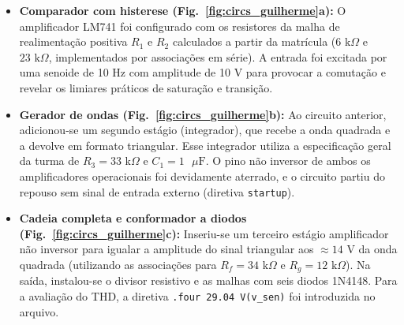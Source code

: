 \documentclass[11pt,a4paper]{article}
\begin{document}
\begin{itemize}
    \item \textbf{Comparador com histerese (Fig.~\ref{fig:circs_guilherme}a):} O amplificador LM741 foi configurado com os resistores da malha de realimentação positiva $R_1$ e $R_2$ calculados a partir da matrícula ($6\text{ k}\Omega$ e $23\text{ k}\Omega$, implementados por associações em série). A entrada foi excitada por uma senoide de 10 Hz com amplitude de 10 V para provocar a comutação e revelar os limiares práticos de saturação e transição. 
    
    \item \textbf{Gerador de ondas (Fig.~\ref{fig:circs_guilherme}b):} Ao circuito anterior, adicionou-se um segundo estágio (integrador), que recebe a onda quadrada e a devolve em formato triangular. Esse integrador utiliza a especificação geral da turma de $R_3 = 33\text{ k}\Omega$ e $C_1 = 1\text{ }\mu\text{F}$. O pino não inversor de ambos os amplificadores operacionais foi devidamente aterrado, e o circuito partiu do repouso sem sinal de entrada externo (diretiva \texttt{startup}).

    \item \textbf{Cadeia completa e conformador a diodos (Fig.~\ref{fig:circs_guilherme}c):} Inseriu-se um terceiro estágio amplificador não inversor para igualar a amplitude do sinal triangular aos $\approx 14\text{ V}$ da onda quadrada (utilizando as associações para $R_f = 34\text{ k}\Omega$ e $R_g = 12\text{ k}\Omega$). Na saída, instalou-se o divisor resistivo e as malhas com seis diodos 1N4148. Para a avaliação do THD, a diretiva \texttt{.four 29.04 V(v\_sen)} foi introduzida no arquivo.
\end{itemize}
\end{document}
